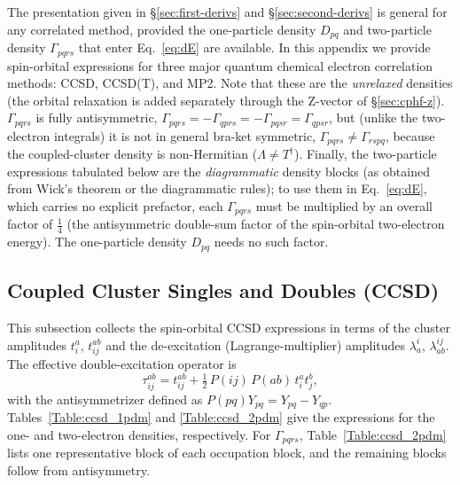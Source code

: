 \documentclass[12pt]{article}
\begin{document}
The presentation given in \S\ref{sec:first-derivs} and \S\ref{sec:second-derivs}
is general for any correlated method,
provided the one-particle density $D_{pq}$ and two-particle density
$\Gamma_{pqrs}$ that enter Eq.~\eqref{eq:dE} are available.  In this appendix
we provide spin-orbital expressions for three major quantum chemical electron
correlation methods: CCSD, CCSD(T), and MP2.  Note that these are the {\em
unrelaxed} densities (the orbital relaxation is added separately through the
Z-vector of \S\ref{sec:cphf-z}).  $\Gamma_{pqrs}$ is fully antisymmetric, $\Gamma_{pqrs} =
-\Gamma_{qprs} = -\Gamma_{pqsr} = \Gamma_{qpsr}$, but (unlike the two-electron
integrals) it is not in general bra-ket symmetric, $\Gamma_{pqrs} \neq
\Gamma_{rspq}$, because the coupled-cluster density is non-Hermitian
($\Lambda \neq T^\dagger$).  Finally, the two-particle expressions tabulated
below are the {\em diagrammatic} density blocks (as obtained from Wick's theorem
or the diagrammatic rules); to use them in Eq.~\eqref{eq:dE}, which carries no
explicit prefactor, each $\Gamma_{pqrs}$ must be multiplied by an overall factor
of $\frac14$ (the antisymmetric double-sum factor of the spin-orbital
two-electron energy).  The one-particle density $D_{pq}$ needs no such factor.

\subsection{Coupled Cluster Singles and Doubles (CCSD)}
\label{sec:ccsd_pdms}

This subsection collects the spin-orbital CCSD expressions in terms of the
cluster amplitudes $t_i^a$, $t_{ij}^{ab}$ and the de-excitation
(Lagrange-multiplier) amplitudes $\lambda^i_a$, $\lambda^{ij}_{ab}$.  The
effective double-excitation operator is
\begin{equation}
\tau_{ij}^{ab} = t_{ij}^{ab} + \tfrac12\,P(ij)\,P(ab)\, t_i^a t_j^b,
\label{eq:tau}
\end{equation}
with the antisymmetrizer defined as $P(pq)Y_{pq} = Y_{pq} - Y_{qp}$.
Tables~\ref{Table:ccsd_1pdm} and \ref{Table:ccsd_2pdm} give the expressions
for the one- and two-electron densities, respectively.  For $\Gamma_{pqrs}$,
Table~\ref{Table:ccsd_2pdm} lists one representative block of each occupation
block, and the remaining blocks follow from antisymmetry.
\end{document}
